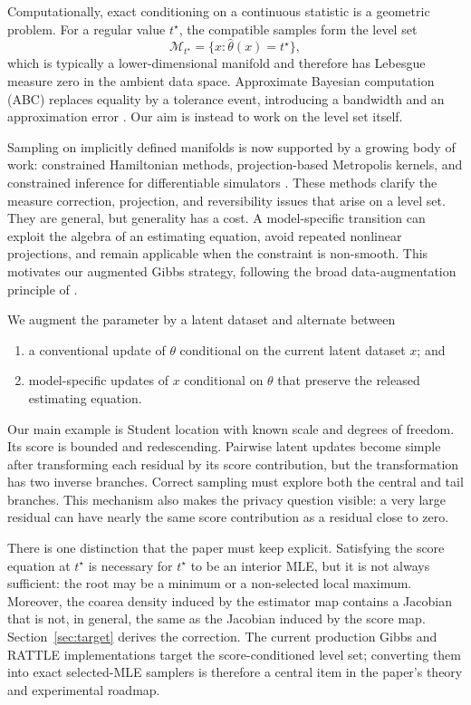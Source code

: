 \documentclass[smallextended,natbib,runningheads]{svjour3}
\begin{document}
Computationally, exact conditioning on a continuous statistic is a geometric
problem.  For a regular value $t^\star$, the compatible samples form the level
set
\begin{equation}
  \mathcal M_{t^\star}=\{x:\hat\theta(x)=t^\star\},
  \label{eq:mle_level_set_intro}
\end{equation}
which is typically a lower-dimensional manifold and therefore has Lebesgue
measure zero in the ambient data space.  Approximate Bayesian computation
(ABC) replaces equality by a tolerance event, introducing a bandwidth and an
approximation error \citep{marin2012}.  Our aim is instead to work on the level
set itself.

Sampling on implicitly defined manifolds is now supported by a growing body of
work: constrained Hamiltonian methods, projection-based Metropolis kernels,
and constrained inference for differentiable simulators
\citep{brubaker2012,graham2017,zappa2018,lelievre2019}.  These methods clarify
the measure correction, projection, and reversibility issues that arise on a
level set.  They are general, but generality has a cost.  A model-specific
transition can exploit the algebra of an estimating equation, avoid repeated
nonlinear projections, and remain applicable when the constraint is
non-smooth.  This motivates our augmented Gibbs strategy, following the broad
data-augmentation principle of \citet{tanner1987}.

We augment the parameter by a latent dataset and alternate between

\begin{enumerate}
    \item a conventional update of $\theta$ conditional on the current latent
    dataset $x$; and
    \item model-specific updates of $x$ conditional on $\theta$ that preserve
    the released estimating equation.
\end{enumerate}

Our main example is Student location with known scale and degrees of freedom.
Its score is bounded and redescending.  Pairwise latent updates become simple
after transforming each residual by its score contribution, but the
transformation has two inverse branches.  Correct sampling must explore both
the central and tail branches.  This mechanism also makes the privacy question
visible: a very large residual can have nearly the same score contribution as
a residual close to zero.

There is one distinction that the paper must keep explicit.  Satisfying the
score equation at $t^\star$ is necessary for $t^\star$ to be an interior MLE,
but it is not always sufficient: the root may be a minimum or a non-selected
local maximum.  Moreover, the coarea density induced by the estimator map
contains a Jacobian that is not, in general, the same as the Jacobian induced
by the score map.  Section~\ref{sec:target} derives the correction.  The current
production Gibbs and RATTLE implementations target the score-conditioned
level set; converting them into exact selected-MLE samplers is therefore a
central item in the paper's theory and experimental roadmap.
\end{document}
